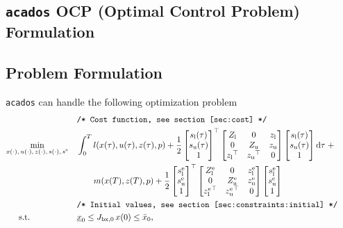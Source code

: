 \documentclass[
a4paper, %
10pt, %
notitlepage,
english]{CSUniSchoolLabReport}
\newcommand{\acados}{\texttt{acados}}
\newcommand{\tran}{^\top}
\newcommand{\ind}[1]{_{\textrm{#1}}}
\newcommand{\terminal}{^{\textrm{e}}}
\newcommand{\matr}[1]{\begin{bmatrix}#1\end{bmatrix}}
\newcommand{\Lower}{\ind{l}}
\newcommand{\upper}{\ind{u}}
\newcommand{\mathComment}[1]{\texttt{/* #1 */}}
\begin{document}

\begin{appendices}

\chapter{\acados{} OCP (Optimal Control Problem) Formulation} \label{acados_ocp_nlp_formulation}

\section{Problem Formulation}\label{sec:problem}
%
\acados{} can handle the following optimization problem
%
\begin{align}
	&&&\mathComment{Cost function, see section \ref{sec:cost}}\nonumber\\
	&\underset{\begin{subarray}{c}
			x(\cdot),\,u(\cdot), \, z(\cdot), \, s(\cdot), \, s\terminal
	\end{subarray}}{\min}
	&&\int_0^T l(x(\tau), u(\tau), z(\tau), p)
	+ \frac{1}{2} \matr{s\Lower(\tau) \\ s\upper(\tau) \\ 1} \tran
	\matr{ Z\Lower & 0 & z\Lower \\
		0 & Z\upper & z\upper \\
		{z\Lower}\tran & {z\upper}\tran & 0}
	\matr{s\Lower(\tau) \\ s\upper(\tau) \\ 1} \mathrm{d}\tau \; + \nonumber\\
	&&& \quad \quad m(x(T), z(T), p) +
	\frac{1}{2} \matr{s\Lower\terminal \\ s\upper\terminal \\ 1} \tran
	\matr{ Z\Lower\terminal & 0 & z\Lower\terminal \\
		0 & Z\upper\terminal & z\upper\terminal \\
		{z\Lower\terminal}\tran & {z\upper\terminal}\tran & 0}
	\matr{s\Lower\terminal \\ s\upper\terminal \\ 1}
	\label{eq:cost}\\
	&&&\mathComment{Initial values, see section \ref{sec:constraints:initial}}\nonumber\\
	&\,\,\,\quad \text{s.t.}    &&\underline{x}_0 \leq J_{\textrm{bx},0} \, x(0) \leq \bar{x}_0 , && \label{eq:constraints:initial}\\[1ex]

\end{align}
\end{appendices}
\end{document}
